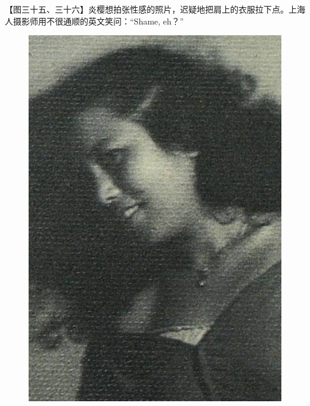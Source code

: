 \clearpage
\par 【图三十五、三十六】炎樱想拍张性感的照片，迟疑地把肩上的衣服拉下点。上海人摄影师用不很通顺的英文笑问：“Shame, eh？”
\begin{figure}[htb]
    \centering %
    \includegraphics[scale=0.4]{picture/对照记35.jpeg}

\end{figure}
